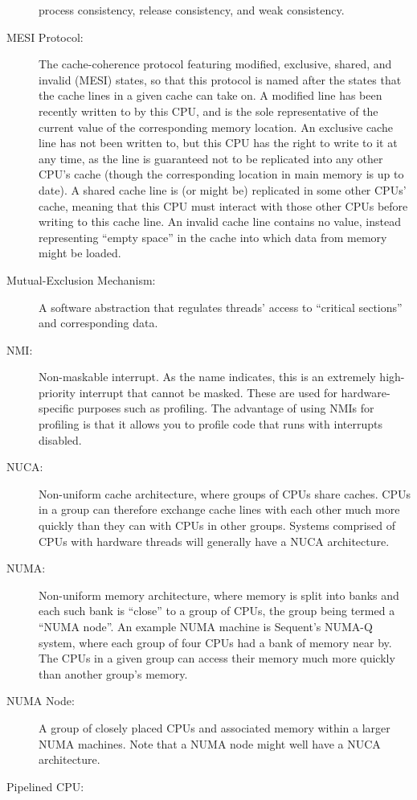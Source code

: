 \begin{description}
	process consistency, release consistency, and weak consistency.
\item[MESI Protocol:]
	The
	cache-coherence protocol featuring
	modified, exclusive, shared, and invalid (MESI) states,
	so that this protocol is named after the states that the
	cache lines in a given cache can take on.
	A modified line has been recently written to by this CPU,
	and is the sole representative of the current value of
	the corresponding memory location.
	An exclusive cache line has not been written to, but this
	CPU has the right to write to it at any time, as the line
	is guaranteed not to be replicated into any other CPU's cache
	(though the corresponding location in main memory is up to date).
	A shared cache line is (or might be) replicated in some other
	CPUs' cache, meaning that this CPU must interact with those other
	CPUs before writing to this cache line.
	An invalid cache line contains no value, instead representing
	``empty space'' in the cache into which data from memory might
	be loaded.
\item[Mutual-Exclusion Mechanism:]
	A software abstraction that regulates threads' access to
	``critical sections'' and corresponding data.
\item[NMI:]
	Non-maskable interrupt.
	As the name indicates, this is an extremely high-priority
	interrupt that cannot be masked.
	These are used for hardware-specific purposes such as profiling.
	The advantage of using NMIs for profiling is that it allows you
	to profile code that runs with interrupts disabled.
\item[NUCA:]
	Non-uniform cache architecture, where groups of CPUs share
	caches.
	CPUs in a group can therefore exchange cache lines with each
	other much more quickly than they can with CPUs in other groups.
	Systems comprised of CPUs with hardware threads will generally
	have a NUCA architecture.
\item[NUMA:]
	Non-uniform memory architecture, where memory is split into
	banks and each such bank is ``close'' to a group of CPUs,
	the group being termed a ``NUMA node''.
	An example NUMA machine is Sequent's NUMA-Q system, where
	each group of four CPUs had a bank of memory near by.
	The CPUs in a given group can access their memory much
	more quickly than another group's memory.
\item[NUMA Node:]
	A group of closely placed CPUs and associated memory within
	a larger NUMA machines.
	Note that a NUMA node might well have a NUCA architecture.
\item[Pipelined CPU:]

\end{description}
